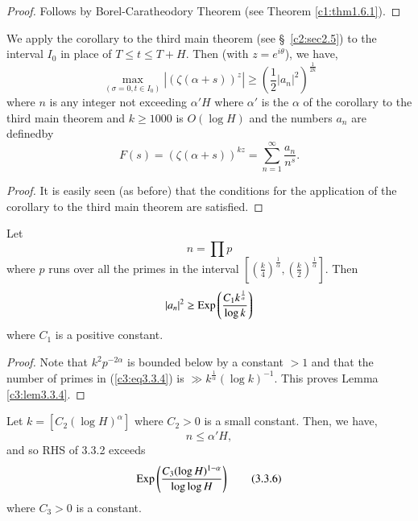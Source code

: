 \begin{proof}
Follows by Borel-Caratheodory Theorem (see Theorem \ref{c1:thm1.6.1}). 
\end{proof}

\begin{sublemma}\label{c3:lem3.3.4}
We apply the corollary to the third main theorem (see \S\ \ref{c2:sec2.5}) to the interval $I_0$ in place of $T \leq t \leq T + H$. Then (with $z = e^{i\theta}$), we have,
\begin{equation*}
\max\limits_{(\sigma = 0 , t \in I_0)} |(\zeta(\alpha+s))^z| \geq \left(\frac{1}{2} |a_n|^2 \right)^{\frac{1}{2k}} \tag{3.3.2}\label{c3:eq3.3.2}
\end{equation*}
where $n$ is any integer not exceeding $\alpha' H$ where $\alpha'$ is the $\alpha$ of the corollary to the third main theorem and $k \geq 1000$ is $O(\log H)$ and the numbers $a_n$ are defined\pageoriginale by
\begin{equation*}
F(s) = (\zeta(\alpha + s))^{kz} = \sum\limits^{\infty}_{n=1} \frac{a_n}{n^s}. \tag{3.3.3}\label{c3:eq3.3.3}
\end{equation*}
\end{sublemma}

\begin{proof}
It is easily seen (as before) that the conditions for the application of the corollary to the third main theorem are satisfied.
\end{proof}

\begin{sublemma}\label{c3:lem3.3.5}
Let
\begin{equation*}
n = \prod p \tag{3.3.4}\label{c3:eq3.3.4}
\end{equation*}
where $p$ runs over all  the primes in the interval $[(\frac{k}{4})^{\frac{1}{\alpha}}, (\frac{k}{2})^{\frac{1}{\alpha}}]$. Then
$$
|a_n|^2 \geq \operatorname{Exp} \left( \frac{C_1 k^{\frac{1}{\alpha}}}{\log k}\right)
$$
where $C_1$ is a positive constant.
\end{sublemma}

\begin{proof}
Note that $k^2 p^{-2\alpha}$ is bounded below by a constant $>1$ and that the number of primes in (\ref{c3:eq3.3.4}) is $\gg k^{\frac{1}{\alpha}} (\log k)^{-1}$. This proves Lemma \ref{c3:lem3.3.4}.
\end{proof}

\begin{sublemma}\label{c3:lem3.3.6}
Let $k = [C_2 (\log H)^{\alpha}]$ where $C_2 >0$ is a small constant. Then, we have,
\begin{equation*}
n \leq \alpha' H, \tag{3.3.5}\label{c3:eq3.3.5}
\end{equation*}
and so RHS of 3.3.2 exceeds 
\begin{equation*}
\operatorname{Exp} \left( \frac{C_3 (\log H)^{1-\alpha}}{\log \log H}\right) \tag{3.3.6}\label{c3:eq3.3.6}
\end{equation*}
where $C_3 > 0$ is a constant.
\end{sublemma}

